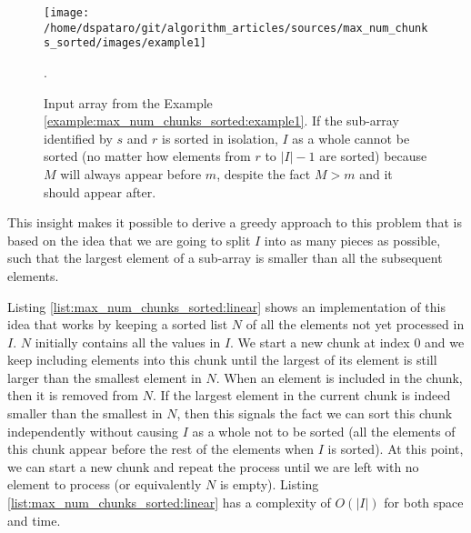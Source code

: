 \begin{figure}
  \centering
   \texttt{[image: /home/dspataro/git/algorithm\_articles/sources/max\_num\_chunks\_sorted/images/example1]}
   \caption[]{Input array from the Example \ref{example:max_num_chunks_sorted:example1}. If the 
   sub-array identified by $s$ and $r$ is sorted in isolation, $I$ as a whole cannot be sorted (no matter how elements from $r$ to $|I|-1$ are sorted)
   because $M$ will always appear before $m$, despite the fact $M>m$ and it should appear after.}.
   \label{fig:max_num_chunks_sorted:example1}
\end{figure}

This insight makes it possible to derive a greedy approach to this problem that is based on the idea that we 
are going to split $I$ into as many pieces as possible, such that the largest element of a sub-array 
is smaller than all the subsequent elements. 

Listing \ref{list:max_num_chunks_sorted:linear} shows an implementation of this  idea that works by keeping a sorted list $N$
of all the elements not yet processed in $I$. $N$ initially contains all the values in $I$.
We start a new chunk at index $0$ and we keep including elements into this chunk until the largest
of its element is still larger than the smallest element in $N$.
When an element is included in the chunk, then it is removed from $N$.
If the largest element in the current chunk is indeed smaller than the smallest in $N$,
then this signals the fact we can sort this chunk independently without
causing $I$ as a whole not to be sorted (all the elements of this chunk appear before the rest of the elements when $I$ is sorted).
At this point, we can start a new chunk and repeat the process until
we are left with no element to process (or equivalently $N$ is empty).
Listing \ref{list:max_num_chunks_sorted:linear} has a complexity of $O(|I|)$  for both space and time. 

